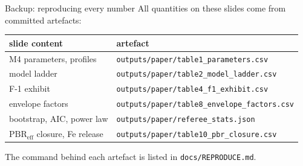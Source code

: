 \documentclass[aspectratio=169,10pt]{beamer}
\newcommand{\PBR}{\mathrm{PBR}_{\mathrm{eff}}}
\begin{document}
\begin{frame}{Backup: reproducing every number}
\small
All quantities on these slides come from committed artefacts:

\vspace{0.6em}
\begin{tabular}{ll}
\toprule
slide content & artefact \\
\midrule
M4 parameters, profiles & \texttt{outputs/paper/table1\_parameters.csv} \\
model ladder & \texttt{outputs/paper/table2\_model\_ladder.csv} \\
F-1 exhibit & \texttt{outputs/paper/table4\_f1\_exhibit.csv} \\
envelope factors & \texttt{outputs/paper/table8\_envelope\_factors.csv} \\
bootstrap, AIC, power law & \texttt{outputs/paper/referee\_stats.json} \\
$\PBR$ closure, Fe release & \texttt{outputs/paper/table10\_pbr\_closure.csv} \\
\bottomrule
\end{tabular}

\vspace{1em}
The command behind each artefact is listed in
\texttt{docs/REPRODUCE.md}.
\end{frame}
\end{document}
